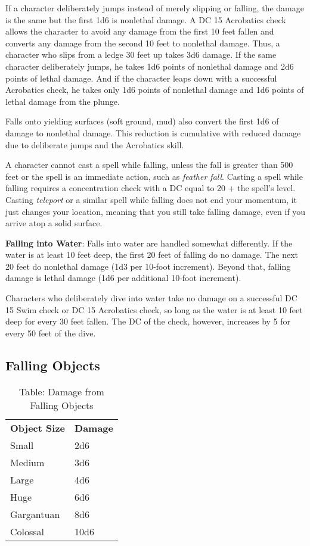 If a character deliberately jumps instead of merely slipping or falling, the damage is the same but the first 1d6 is nonlethal damage. A DC 15 Acrobatics check allows the character to avoid any damage from the first 10 feet fallen and converts any damage from the second 10 feet to nonlethal damage. Thus, a character who slips from a ledge 30 feet up takes 3d6 damage. If the same character deliberately jumps, he takes 1d6 points of nonlethal damage and 2d6 points of lethal damage. And if the character leaps down with a successful Acrobatics check, he takes only 1d6 points of nonlethal damage and 1d6 points of lethal damage from the plunge. 
				
Falls onto yielding surfaces (soft ground, mud) also convert the first 1d6 of damage to nonlethal damage. This reduction is cumulative with reduced damage due to deliberate jumps and the Acrobatics skill.
				
A character cannot cast a spell while falling, unless the fall is greater than 500 feet or the spell is an immediate action, such as \textit{feather fall}. Casting a spell while falling requires a concentration check with a DC equal to 20 + the spell's level. Casting \textit{teleport} or a similar spell while falling does not end your momentum, it just changes your location, meaning that you still take falling damage, even if you arrive atop a solid surface.
				
\textbf{Falling into Water}: Falls into water are handled somewhat differently. If the water is at least 10 feet deep, the first 20 feet of falling do no damage. The next 20 feet do nonlethal damage (1d3 per 10-foot increment). Beyond that, falling damage is lethal damage (1d6 per additional 10-foot increment).
				
Characters who deliberately dive into water take no damage on a successful DC 15 Swim check or DC 15 Acrobatics check, so long as the water is at least 10 feet deep for every 30 feet fallen. The DC of the check, however, increases by 5 for every 50 feet of the dive. 
				
\subsection{Falling Objects}

\begin{table}[]
\sffamily
\caption{Table: Damage from Falling Objects}
\begin{tabular}{ll}
\textbf{Object Size} & \textbf{Damage}\\
Small & 2d6 \\
 Medium & 3d6 \\
 Large & 4d6 \\
 Huge & 6d6 \\
 Gargantuan & 8d6 \\
 Colossal & 10d6\\
\end{tabular}
\end{table}

